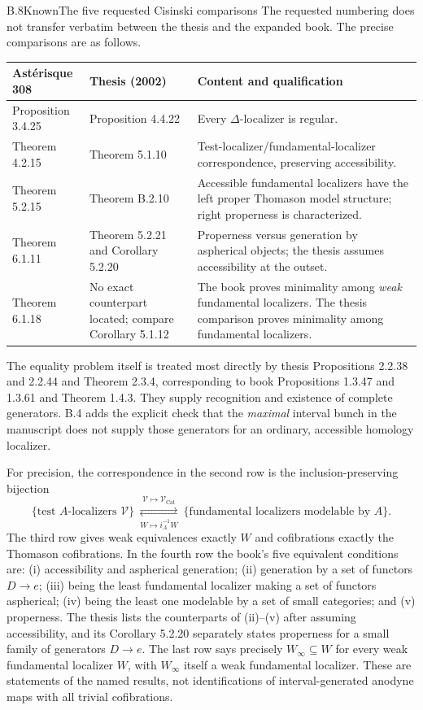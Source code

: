 \begin{claim}{B.8}{Known}{The five requested Cisinski comparisons}\label{B8}
The requested numbering does not transfer verbatim between the thesis and
the expanded book.  The precise comparisons are as follows.
\begin{center}\small
\begin{tabular}{p{.16\linewidth}p{.20\linewidth}p{.55\linewidth}}
\hline
Ast\'erisque 308 & Thesis (2002) & Content and qualification\\
\hline
Proposition 3.4.25 & Proposition 4.4.22 & Every $\Delta$-localizer is regular.\\
Theorem 4.2.15 & Theorem 5.1.10 & Test-localizer/fundamental-localizer correspondence, preserving accessibility.\\
Theorem 5.2.15 & Theorem B.2.10 & Accessible fundamental localizers have the left proper Thomason model structure; right properness is characterized.\\
Theorem 6.1.11 & Theorem 5.2.21 and Corollary 5.2.20 & Properness versus generation by aspherical objects; the thesis assumes accessibility at the outset.\\
Theorem 6.1.18 & No exact counterpart located; compare Corollary 5.1.12 & The book proves minimality among \emph{weak} fundamental localizers. The thesis comparison proves minimality among fundamental localizers.\\
\hline
\end{tabular}
\end{center}
The equality problem itself is treated most directly by thesis
Propositions 2.2.38 and 2.2.44 and Theorem 2.3.4, corresponding to book
Propositions 1.3.47 and 1.3.61 and Theorem 1.4.3.  They supply recognition
and existence of complete generators.  B.4 adds the explicit check that
the \emph{maximal} interval bunch in the manuscript does not supply those
generators for an ordinary, accessible homology localizer.

For precision, the correspondence in the second row is the
inclusion-preserving bijection
\[
 \{\text{test }A\text{-localizers }\mathcal V\}
  \ \underset{W\mapsto i_A^{-1}W}{\overset{\mathcal V\mapsto
  \mathcal V_{\mathrm{Cat}}}{\rightleftarrows}}\
 \{\text{fundamental localizers modelable by }A\}.
\]
The third row gives weak equivalences exactly $W$ and cofibrations exactly
the Thomason cofibrations.  In the fourth row the book's five equivalent
conditions are: (i) accessibility and aspherical generation;
(ii) generation by a set of functors $D\to e$;
(iii) being the least fundamental localizer making a set of functors
aspherical; (iv) being the least one modelable by a set of small
categories; and (v) properness.  The thesis lists the counterparts of
(ii)--(v) after assuming accessibility, and its Corollary 5.2.20 separately
states properness for a small family of generators $D\to e$.
The last row says precisely $W_\infty\subseteq W$ for every weak
fundamental localizer $W$, with $W_\infty$ itself a weak fundamental
localizer.  These are statements of the named results, not identifications
of interval-generated anodyne maps with all trivial cofibrations.
\end{claim}

